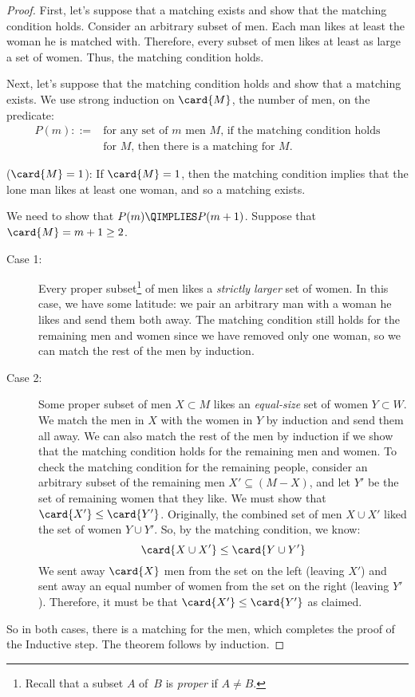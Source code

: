 \begin{proof}
First, let's suppose that a matching exists and show that the matching
condition holds.  Consider an arbitrary subset of men.  Each man likes
at least the woman he is matched with.  Therefore, every subset of men
likes at least as large a set of women.  Thus, the matching condition
holds.

Next, let's suppose that the matching condition holds and show that a
matching exists.  We use strong induction on $\card{M}$, the number of
men, on the predicate:
\begin{align*}
    P(m) ::={} & \text{for any set of $m$ men~$M$, if the matching
      condition holds} \\
             & \text{for~$M$, then there is a matching for~$M$.}
\end{align*}

 ($\card{M}=1$): If $\card{M} = 1$, then the
matching condition implies that the lone man likes at least one woman,
and so a matching exists.

 We need to show that $P(m) \QIMPLIES
P(m + 1)$.  Suppose that $\card{M} = m + 1 \ge 2$.
\begin{description}

\item[Case 1:] Every proper subset\footnote{Recall that a subset $A$
  of~$B$ is \emph{proper} if $A \ne B$.} of men likes a \emph{strictly
  larger} set of women.  In this case, we have some latitude: we pair
  an arbitrary man with a woman he likes and send them both away.  The
  matching condition still holds for the remaining men and women since
  we have removed only one woman, so we can match the rest of the
  men by induction.

\item[Case 2:] Some proper subset of men $X \subset M$ likes an
  \emph{equal-size} set of women $Y \subset W$.  We match the men in
  $X$ with the women in $Y$ by induction and send them all away.  We
  can also match the rest of the men by induction if we show that the
  matching condition holds for the remaining men and women.  To check
  the matching condition for the remaining people, consider an
  arbitrary subset of the remaining men $X' \subseteq (M - X)$, and
  let $Y'$ be the set of remaining women that they like.  We must show
  that $\card{X'} \leq \card{Y'}$.  Originally, the combined set of
  men $X \cup X'$ liked the set of women $Y \cup Y'$.  So, by the
  matching condition, we know:
%
  \begin{equation*}
  \card{X \cup X'}  \leq  \card{Y \cup Y'}
  \end{equation*}
%
  We sent away $\card{X}$ men from the set on the left (leaving $X'$)
  and sent away an equal number of women from the set on the right
  (leaving $Y'$).  Therefore, it must be that $\card{X'} \leq
  \card{Y'}$ as claimed.
\end{description}

So in both cases, there is a matching for the men, which completes the
proof of the Inductive step.  The theorem follows by induction.
\end{proof}


